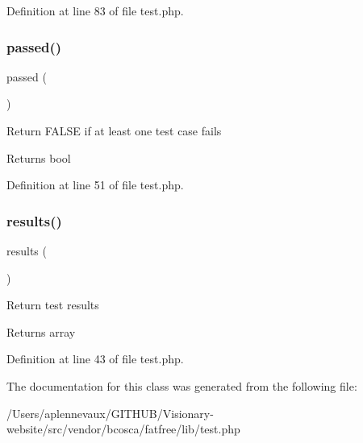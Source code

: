 Definition at line 83 of file test.\+php.

\hypertarget{class_test_a846b7d46e6d54e369e91f13b8326ec50}{}\label{class_test_a846b7d46e6d54e369e91f13b8326ec50} 
\subsubsection{\texorpdfstring{passed()}{passed()}}
{\footnotesize\ttfamily passed (\begin{DoxyParamCaption}{ }\end{DoxyParamCaption})}

Return F\+A\+L\+SE if at least one test case fails \begin{DoxyReturn}{Returns}
bool 
\end{DoxyReturn}


Definition at line 51 of file test.\+php.

\hypertarget{class_test_a81532ad36ede4bfc6cd5e69a321f3df4}{}\label{class_test_a81532ad36ede4bfc6cd5e69a321f3df4} 
\subsubsection{\texorpdfstring{results()}{results()}}
{\footnotesize\ttfamily results (\begin{DoxyParamCaption}{ }\end{DoxyParamCaption})}

Return test results \begin{DoxyReturn}{Returns}
array 
\end{DoxyReturn}


Definition at line 43 of file test.\+php.



The documentation for this class was generated from the following file\+:\begin{DoxyCompactItemize}
\item 
/\+Users/aplennevaux/\+G\+I\+T\+H\+U\+B/\+Visionary-\/website/src/vendor/bcosca/fatfree/lib/test.\+php\end{DoxyCompactItemize}
